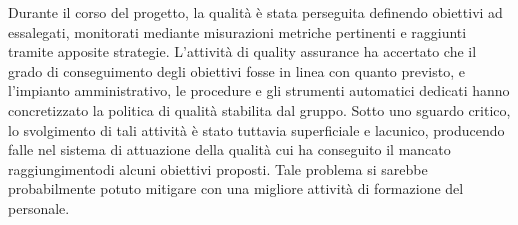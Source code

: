 Durante il corso del progetto, la qualità è stata perseguita definendo obiettivi ad essalegati, monitorati mediante misurazioni metriche pertinenti e raggiunti tramite apposite strategie. L'attività di quality assurance ha accertato che il grado di conseguimento degli obiettivi fosse in linea con quanto previsto, e l'impianto amministrativo, le procedure e gli strumenti automatici dedicati hanno concretizzato la politica di qualità stabilita dal gruppo. Sotto uno sguardo critico, lo svolgimento di tali attività è stato tuttavia superficiale e lacunico, producendo falle nel sistema di attuazione della qualità cui ha conseguito il mancato raggiungimentodi alcuni obiettivi proposti. Tale problema si sarebbe probabilmente potuto mitigare con una migliore attività di formazione del personale.